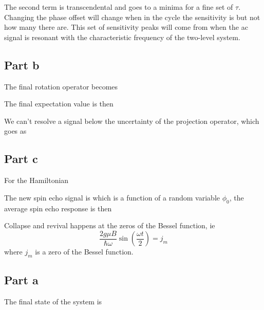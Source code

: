The second term is transcendental and goes to a minima for a fine set of $\tau$. Changing the phase offset will change when in the cycle the sensitivity is but not how many there are. This set of sensitivity peaks will come from when the ac signal is resonant with the characteristic frequency of the two-level system.

\subsection*{Part b}
The final rotation operator becomes

The final expectation value is then

We can't resolve a signal below the uncertainty of the projection operator, which goes as
\subsection*{Part c}
For the Hamiltonian

The new spin echo signal is
which is a function of a random variable $\phi_0$, the average spin echo response is then

Collapse and revival happens at the zeros of the Bessel function, ie
$$
\frac{2g\mu B}{\hbar \omega}\sin( \frac{\omega t}{2}) = j_m
$$
where $j_m$ is a zero of the Bessel function.

\subsection*{Part a}
The final state of the system is

